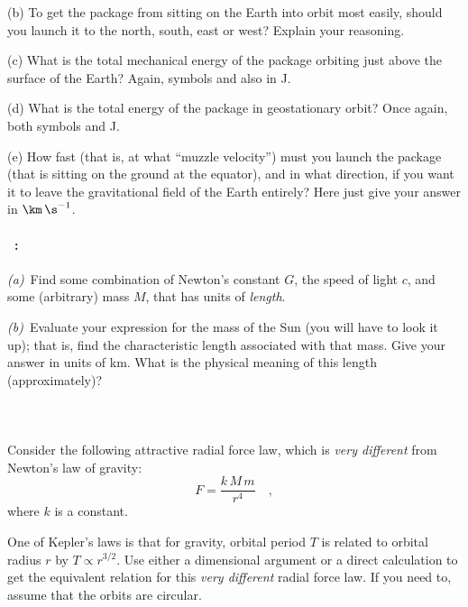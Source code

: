 \documentclass[12pt]{article}
\newcounter{problem}
\begin{document}
(b) To get the package from sitting on the Earth into orbit most
easily, should you launch it to the north, south, east or west?
Explain your reasoning.

(c) What is the total mechanical energy of the package orbiting just
above the surface of the Earth? Again, symbols and also in J.

(d) What is the total energy of the package in geostationary
orbit? Once again, both symbols and J.

(e) How fast (that is, at what ``muzzle velocity'') must you launch
the package (that is sitting on the ground at the equator), and in what direction, if
you want it to leave the gravitational field of the Earth entirely?
Here just give your answer in $\km\,\s^{-1}$.

\paragraph{\problemname~\theproblem:}%
\textsl{(a)}~Find some combination of Newton's constant $G$, the speed of light $c$, and
some (arbitrary) mass $M$, that has units of \emph{length}.

\textsl{(b)}~Evaluate your expression for the mass of the Sun (you
will have to look it up); that is, find the characteristic length
associated with that mass.  Give your answer in units of km.  What is
the physical meaning of this length (approximately)?

\paragraph{\problemname~\theproblem}

Consider the following attractive radial force law, which is
\emph{very different} from Newton's law of gravity:
\begin{equation}
F = \frac{k\,M\,m}{r^4} \quad ,
\end{equation}
where $k$ is a constant.

One of Kepler's laws is that for gravity, orbital period $T$ is
related to orbital radius $r$ by $T\propto r^{3/2}$.  Use either a
dimensional argument or a direct calculation to get the equivalent
relation for this \emph{very different} radial force law.  If you need
to, assume that the orbits are circular.

\paragraph{\problemname~\theproblem}
\end{document}
